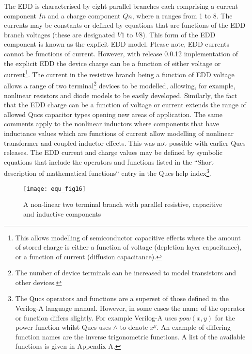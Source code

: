The EDD is characterised by eight parallel branches each comprising a
current component $In$ and a charge component $Qn$, where n ranges
from 1 to 8. The currents may be constants or defined by equations
that are functions of the EDD branch voltages (these are designated
$V1$ to $V8$). This form of the EDD component is known as the explicit
EDD model. Please note, EDD currents cannot be functions of
current. However, with release 0.0.12 implementation of the explicit
EDD the device charge can be a function of either voltage or
current\footnote{This allows modelling of semiconductor capacitive
effects where the amount of stored charge is either a function of
voltage (depletion layer capacitance), or a function of current
(diffusion capacitance).}. The current in the resistive branch being a
function of EDD voltage allows a range of two terminal\footnote{The
number of device terminals can be increased to model transistors and
other devices.} devices to be modelled, allowing, for example,
nonlinear resistors and diode models to be easily developed.
Similarly, the fact that the EDD charge can be a function of voltage
or current extends the range of allowed Qucs capacitor types opening
new areas of application.  The same comments apply to the nonlinear
inductors where components that have inductance values which are
functions of current allow modelling of nonlinear transformer and
coupled inductor effects. This was not possible with earlier Qucs
releases.
The EDD current and charge values may be defined by symbolic equations
that include the operators and functions listed in the ``Short
description of mathematical functions`` entry in the Qucs help
index\footnote{The Qucs operators and functions are a superset of
those defined in the Verilog-A language manual. However, in some cases
the name of the operator or function differs slightly. For example
Verilog-A uses $pow(x,y)$ for the power function whilst Qucs uses
$\wedge$ to denote $x^y$. An example of differing function names are
the inverse trigonometric functions. A list of the available functions
is given in Appendix A. }.

\begin{figure}[h]
  \centering
  \texttt{[image: equ\_fig16]} 
  \caption{A non-linear two terminal branch with parallel resistive, capacitive and inductive components}
  \label{fig:equ_16}
\end{figure} 


